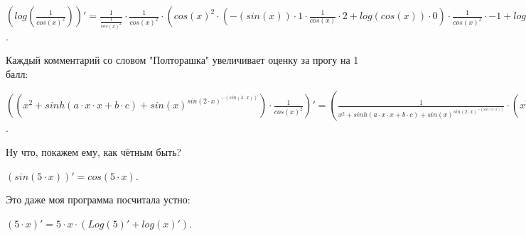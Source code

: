 \documentclass{article}
\begin{document}
\begin{center}$(log( \frac {1} {{{cos(x)^{{2}}}}}))'=  \frac {1} {{ \frac {1} {{{cos(x)^{{2}}}}}}} \cdot  \frac {1} {{{cos(x)^{{2}}}}} \cdot ({cos(x)^{{2}}} \cdot (-(sin(x)) \cdot {1} \cdot  \frac {1} {{cos(x)}} \cdot {{2}}+log(cos(x)) \cdot {0}) \cdot  \frac {1} {{{cos(x)^{{2}}}}} \cdot {{-1}}+log({cos(x)^{{2}}}) \cdot {0})$.\end{center}
Каждый комментарий со словом "Полторашка" увеличивает оценку за прогу на 1 балл:\\
\begin{center}$(({x^{{2}}}+sinh(a \cdot x \cdot x+b \cdot c)+{sin(x)^{sin({2} \cdot x)^{-(sin({3} \cdot x))}}}) \cdot  \frac {1} {{{cos(x)^{{2}}}}})'= ( \frac {1} {{{x^{{2}}}+sinh(a \cdot x \cdot x+b \cdot c)+{sin(x)^{sin({2} \cdot x)^{-(sin({3} \cdot x))}}}}} \cdot ({x^{{2}}} \cdot ({1} \cdot  \frac {1} {{x}} \cdot {{2}}+log(x) \cdot {0})+cosh(a \cdot x \cdot x+b \cdot c) \cdot (( \frac {1} {{a}} \cdot {0}+ \frac {1} {{x}} \cdot {1}+ \frac {1} {{x}} \cdot {1}) \cdot a \cdot x \cdot x+( \frac {1} {{b}} \cdot {0}+ \frac {1} {{c}} \cdot {0}) \cdot b \cdot c)+{sin(x)^{sin({2} \cdot x)^{-(sin({3} \cdot x))}}} \cdot (cos(x) \cdot {1} \cdot  \frac {1} {{sin(x)}} \cdot  \frac {1} {{sin({2} \cdot x)} ^ {sin({3} \cdot x)}}+log(sin(x)) \cdot  \frac {1} {{sin({2} \cdot x)} ^ {sin({3} \cdot x)}} \cdot (cos({2} \cdot x) \cdot ( \frac {1} {{{2}}} \cdot {0}+ \frac {1} {{x}} \cdot {1}) \cdot {2} \cdot x \cdot  \frac {1} {{sin({2} \cdot x)}} \cdot {-(sin({3} \cdot x))}+log(sin({2} \cdot x)) \cdot -(cos({3} \cdot x) \cdot ( \frac {1} {{{3}}} \cdot {0}+ \frac {1} {{x}} \cdot {1}) \cdot {3} \cdot x))))+ \frac {1} {{ \frac {1} {{{cos(x)^{{2}}}}}}} \cdot  \frac {1} {{{cos(x)^{{2}}}}} \cdot ({cos(x)^{{2}}} \cdot (-(sin(x)) \cdot {1} \cdot  \frac {1} {{cos(x)}} \cdot {{2}}+log(cos(x)) \cdot {0}) \cdot  \frac {1} {{{cos(x)^{{2}}}}} \cdot {{-1}}+log({cos(x)^{{2}}}) \cdot {0})) \cdot ({x^{{2}}}+sinh(a \cdot x \cdot x+b \cdot c)+{sin(x)^{sin({2} \cdot x)^{-(sin({3} \cdot x))}}}) \cdot  \frac {1} {{{cos(x)^{{2}}}}}$.\end{center}
Ну что, покажем ему, как чётным быть?\\
\begin{center}$(sin({5} \cdot x))'= cos({5} \cdot x)$.\end{center}
Это даже моя программа посчитала устно:\\
\begin{center}$({5} \cdot x)'={5} \cdot x\cdot (Log({5})' + log(x)')$.\end{center}
\end{document}
